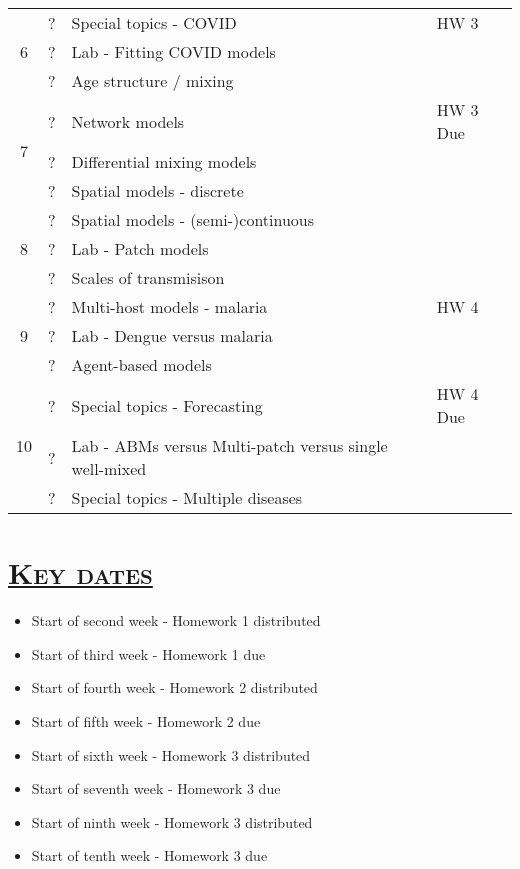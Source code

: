 \documentclass[fancyhdr,10pt]{article}
\begin{document}
\begin{center}
\begin{tabular}{|c|c|m{3in}|l|}
    \multirow{3}{*}{6}  & ?  & Special topics - COVID & HW 3  \\\cline{2-4}
                        & ?  & Lab - Fitting COVID models & \\\cline{2-4}
                        & ?  & Age structure / mixing &\\\hline\hline
    \multirow{3}{*}{7}  & ?  & Network models & HW 3 Due \\\cline{2-4}
                        & ?  & Differential mixing models & \\\cline{2-4}
                        & ?  & Spatial models - discrete &\\\hline\hline
    \multirow{3}{*}{8}  & ?  & Spatial models - (semi-)continuous & \\\cline{2-4}
                        & ?  & Lab - Patch models & \\\cline{2-4}
                        & ?  & Scales of transmisison &\\\hline\hline
    \multirow{3}{*}{9}  & ?  & Multi-host models - malaria & HW 4\\\cline{2-4}
                        & ?  & Lab - Dengue versus malaria & \\\cline{2-4}
                        & ?  & Agent-based models &\\\hline\hline
    \multirow{3}{*}{10} & ?  & Special topics - Forecasting  & HW 4 Due \\\cline{2-4}
                        & ?  & Lab - ABMs versus Multi-patch versus single well-mixed & \\\cline{2-4}
                        & ?  & Special topics - Multiple diseases  &\\\hline\hline
  \end{tabular}
\end{center}

\section*{\underline{\textsc{Key dates}}}
\begin{itemize}
 \item Start of second week - Homework 1 distributed
 \item Start of third week - Homework 1 due
 \item Start of fourth week - Homework 2 distributed
 \item Start of fifth week - Homework 2 due
 \item Start of sixth week - Homework 3 distributed
 \item Start of seventh week - Homework 3 due
 \item Start of ninth week - Homework 3 distributed
 \item Start of tenth week - Homework 3 due
\end{itemize}
\end{document}
